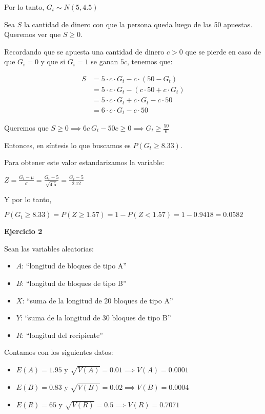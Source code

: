 \documentclass[11pt]{article}
\begin{document}
Por lo tanto, 
$ G_t \sim N(5,4.5)$

Sea $S$ la cantidad de dinero con que la persona queda luego de las 50 apuestas. Queremos ver que $S\geq 0$. 

Recordando que se apuesta una cantidad de dinero $c > 0$ que se pierde en caso de que $G_i=0$ y que si $G_i=1$ se ganan $5c$, tenemos que:

\begin{align*}
    S &= 5\cdot c \cdot G_t - c\cdot (50 - G_t) \\
      &= 5\cdot c \cdot G_t - (c \cdot 50 + c\cdot G_t) \\
      &= 5\cdot c \cdot G_t + c\cdot G_t - c\cdot 50 \\
      &= 6\cdot c \cdot G_t - c\cdot 50
\end{align*}

Queremos que $S \geq 0 \implies 6c \ G_t - 50c \geq 0 \implies G_t \geq \frac{50}{6}$  

Entonces, en s\'intesis lo que buscamos es $P(G_t\geq 8.33)$. 

Para obtener este valor estandarizamos la variable:

$ Z = \frac{G_t - \mu}{\sigma} = \frac{G_t - 5}{\sqrt{4.5}} = \frac{G_t - 5}{2.12}$

Y por lo tanto,

$P(G_t\geq 8.33) = P(Z \geq 1.57) = 1 - P(Z < 1.57) = 1 - 0.9418 = 0.0582$


\textbf{Ejercicio 2}

Sean las variables aleatorias:
\begin{itemize}
    \item $A$: ``longitud de bloques de tipo A''
    \item $B$: ``longitud de bloques de tipo B''
    \item $X$: ``suma de la longitud de 20 bloques de tipo A''
    \item $Y$: ``suma de la longitud de 30 bloques de tipo B''
    \item $R$: ``longitud del recipiente''
\end{itemize}

Contamos con los siguientes datos:
\begin{itemize}
    \item $E(A) = 1.95$ y $\sqrt{V(A)} = 0.01 \implies V(A) = 0.0001$
    \item $E(B) = 0.83$ y $\sqrt{V(B)} = 0.02 \implies V(B) = 0.0004$
    \item $E(R) = 65$ y $\sqrt{V(R)} = 0.5 \implies V(R) = 0.7071$
\end{itemize}
\end{document}
